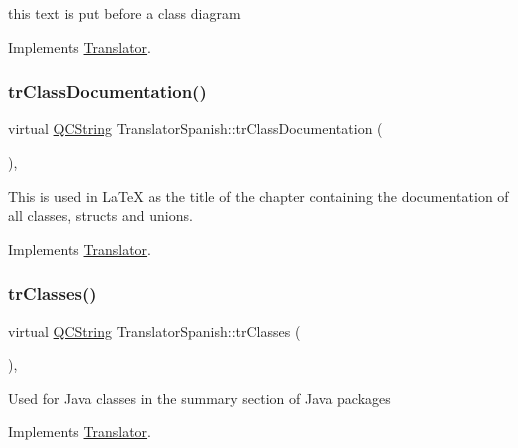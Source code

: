 this text is put before a class diagram 

Implements \mbox{\hyperlink{class_translator}{Translator}}.

\mbox{\label{class_translator_spanish_af386a103e664cdbd7137fb82c73be2f9}} 
\subsubsection{\texorpdfstring{trClassDocumentation()}{trClassDocumentation()}}
{\footnotesize\ttfamily virtual \mbox{\hyperlink{class_q_c_string}{Q\+C\+String}} Translator\+Spanish\+::tr\+Class\+Documentation (\begin{DoxyParamCaption}{ }\end{DoxyParamCaption})\hspace{0.3cm}{\ttfamily [inline]}, {\ttfamily [virtual]}}

This is used in La\+TeX as the title of the chapter containing the documentation of all classes, structs and unions. 

Implements \mbox{\hyperlink{class_translator}{Translator}}.

\mbox{\label{class_translator_spanish_a6ebac01c574f3c47c79f872fc1531719}} 
\subsubsection{\texorpdfstring{trClasses()}{trClasses()}}
{\footnotesize\ttfamily virtual \mbox{\hyperlink{class_q_c_string}{Q\+C\+String}} Translator\+Spanish\+::tr\+Classes (\begin{DoxyParamCaption}{ }\end{DoxyParamCaption})\hspace{0.3cm}{\ttfamily [inline]}, {\ttfamily [virtual]}}

Used for Java classes in the summary section of Java packages 

Implements \mbox{\hyperlink{class_translator}{Translator}}.

\mbox{\label{class_translator_spanish_a8394739af2341e3765e701f9c618d8e7}} 
